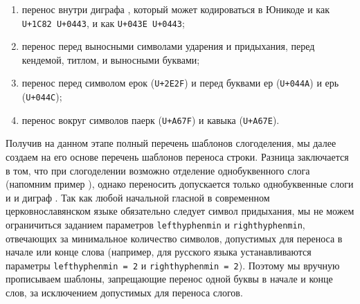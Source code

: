 \documentclass[12pt,a4paper,oneside]{extarticle}
\begin{document}
\begin{enumerate}
\item перенос внутри диграфа , который может кодироваться в Юникоде и как \verb!U+1C82 U+0443!, и как \verb!U+043E U+0443!;
\item перенос перед выносными символами ударения и придыхания, перед кендемой, титлом, и выносными буквами\autocite[Полный перечень символов вместе с их кодовыми точками в Юникоде, а также полный перечень возможных слов с титлом или буквенными титлами см. в работе ][]{utn41};
\item перенос перед символом ерок (\verb!U+2E2F!) и перед буквами ер (\verb!U+044A!) и ерь (\verb!U+044C!);
\item перенос вокруг символов паерк (\verb!U+A67F!) и кавыка (\verb!U+A67E!).
\end{enumerate}

Получив на данном этапе полный перечень шаблонов слогоделения, мы далее создаем на его основе перечень шаблонов переноса строки. Разница заключается в том, что при слогоделении возможно отделение однобуквенного слога (напомним пример ), однако переносить допускается только однобуквенные слоги  и  и диграф . Так как любой начальной гласной в современном церковнославянском языке обязательно следует символ придыхания, мы не можем ограничиться заданием параметров \verb+lefthyphenmin+ и \verb+righthyphenmin+, отвечающих за минимальное количество символов, допустимых для переноса в начале или конце слова (например, для русского языка устанавливаются параметры \verb+lefthyphenmin = 2+ и \verb+righthyphenmin = 2+). Поэтому мы вручную прописываем шаблоны, запрещающие перенос одной буквы в начале и конце слов, за исключением допустимых для переноса слогов.
\end{document}
